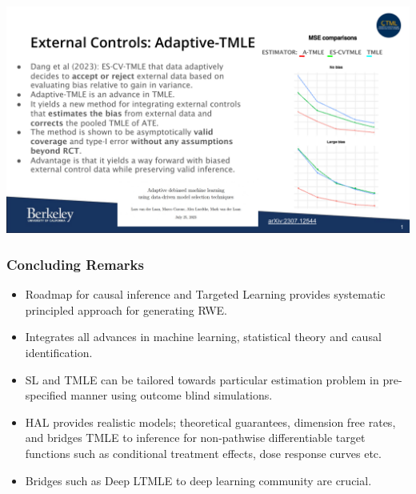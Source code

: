 \documentclass[t]{beamer}
\begin{document}
\begin{frame}
\frametitle{}
\vspace{20pt}
\begin{center}
\includegraphics[width=\textwidth]{figures/9-FDA-RWE-Subcommittee.pdf}
\end{center}
\vspace{35pt}
\end{frame}

\begin{frame}\frametitle{Concluding Remarks}
\begin{itemize}
\item Roadmap for causal inference and Targeted Learning provides systematic principled approach for generating RWE.
\item Integrates all advances in machine learning, statistical theory and causal identification.
\item SL and TMLE can be tailored towards particular estimation problem in pre-specified manner using outcome blind simulations.
\item HAL provides realistic models;  theoretical guarantees, dimension free rates,  and bridges TMLE to inference for non-pathwise differentiable target functions such as conditional treatment effects, dose response curves etc.
\item Bridges such as Deep LTMLE to deep learning community are crucial.
\end{itemize}
\end{frame}
\end{document}
